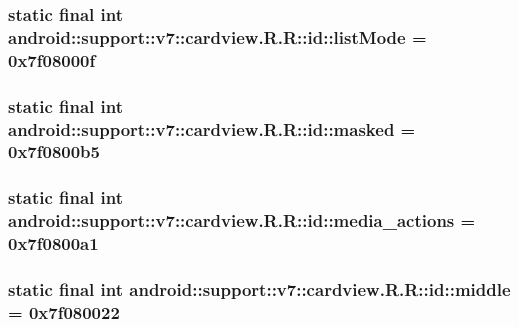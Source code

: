 \hypertarget{classandroid_1_1support_1_1v7_1_1cardview_1_1_r_1_1id_4d1d1d401584c2c0afdc8f32f427a431}{
\subsubsection[{listMode}]{\setlength{\rightskip}{0pt plus 5cm}static final int android::support::v7::cardview.R.R::id::listMode = 0x7f08000f}}
\label{classandroid_1_1support_1_1v7_1_1cardview_1_1_r_1_1id_4d1d1d401584c2c0afdc8f32f427a431}


\hypertarget{classandroid_1_1support_1_1v7_1_1cardview_1_1_r_1_1id_35ecf6f6df6b55a896dd8158f0ace3ca}{
\subsubsection[{masked}]{\setlength{\rightskip}{0pt plus 5cm}static final int android::support::v7::cardview.R.R::id::masked = 0x7f0800b5}}
\label{classandroid_1_1support_1_1v7_1_1cardview_1_1_r_1_1id_35ecf6f6df6b55a896dd8158f0ace3ca}


\hypertarget{classandroid_1_1support_1_1v7_1_1cardview_1_1_r_1_1id_2ede372478588743dac0baf22c293762}{
\subsubsection[{media\_\-actions}]{\setlength{\rightskip}{0pt plus 5cm}static final int android::support::v7::cardview.R.R::id::media\_\-actions = 0x7f0800a1}}
\label{classandroid_1_1support_1_1v7_1_1cardview_1_1_r_1_1id_2ede372478588743dac0baf22c293762}


\hypertarget{classandroid_1_1support_1_1v7_1_1cardview_1_1_r_1_1id_68f9bded8683d108ccd33534f5f770b8}{
\subsubsection[{middle}]{\setlength{\rightskip}{0pt plus 5cm}static final int android::support::v7::cardview.R.R::id::middle = 0x7f080022}}
\label{classandroid_1_1support_1_1v7_1_1cardview_1_1_r_1_1id_68f9bded8683d108ccd33534f5f770b8}


